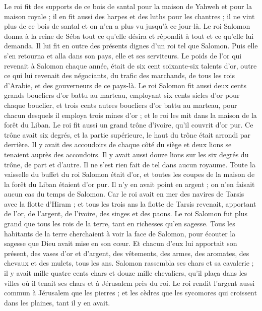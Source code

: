 \begin{multicols}{2}
Le roi fit des supports de ce bois de santal pour la maison de Yahweh et pour la maison royale ; il en fit aussi des harpes et des luths pour les chantres ; il ne vint plus de ce bois de santal et on n’en a plus vu jusqu'à ce jour-là.
Le roi Salomon donna à la reine de Séba tout ce qu'elle désira et répondit à tout et ce qu'elle lui demanda. Il lui fit en outre des présents dignes d'un roi tel que Salomon. Puis elle s'en retourna et alla dans son pays, elle et ses serviteurs.
Le poids de l'or qui revenait à Salomon chaque année, était de six cent soixante-six talents d'or,
outre ce qui lui revenait des négociants, du trafic des marchands, de tous les rois d'Arabie, et des gouverneurs de ce pays-là.
Le roi Salomon fit aussi deux cents grands boucliers d'or battu au marteau, employant six cents sicles d'or pour chaque bouclier,
et trois cents autres boucliers d'or battu au marteau, pour chacun desquels il employa trois mines d'or ; et le roi les mit dans la maison de la forêt du Liban.
Le roi fit aussi un grand trône d'ivoire, qu'il couvrit d’or pur.
Ce trône avait six degrés, et la partie supérieure, le haut du trône était arrondi par derrière. Il y avait des accoudoirs de chaque côté du siège et deux lions se tenaient auprès des accoudoirs.
Il y avait aussi douze lions sur les six degrés du trône, de part et d'autre. Il ne s'est rien fait de tel dans aucun royaume.
Toute la vaisselle du buffet du roi Salomon était d'or, et toutes les coupes de la maison de la forêt du Liban étaient d’or pur. Il n'y en avait point en argent ; on n’en faisait aucun cas du temps de Salomon.
Car le roi avait en mer des navires de Tarsis avec la flotte d'Hiram ; et tous les trois ans la flotte de Tarsis revenait, apportant de l'or, de l'argent, de l'ivoire, des singes et des paons.
Le roi Salomon fut plus grand que tous les rois de la terre, tant en richesses qu'en sagesse.
Tous les habitants de la terre cherchaient à voir la face de Salomon, pour écouter la sagesse que Dieu avait mise en son cœur.
Et chacun d'eux lui apportait son présent, des vases d’or et d'argent, des vêtements, des armes, des aromates, des chevaux et des mulets, tous les ans.
Salomon rassembla ses chars et sa cavalerie ; il y avait mille quatre cents chars et douze mille chevaliers, qu'il plaça dans les villes où il tenait ses chars et à Jérusalem près du roi.
Le roi rendit l'argent aussi commun à Jérusalem que les pierres ; et les cèdres que les sycomores qui croissent dans les plaines, tant il y en avait.

\end{multicols}
